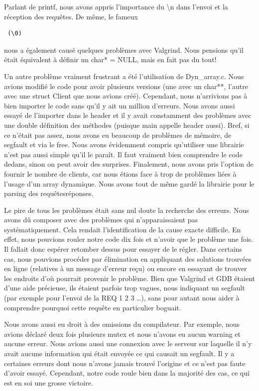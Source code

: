 \documentclass[11pt]{article}
\begin{document}
Parlant de printf, nous avons appris l’importance du \textbackslash n  dans l’envoi et la réception des requêtes. De même, le fameux \begin{verbatim} (\0) \end{verbatim} nous a également causé quelques problèmes avec Valgrind. Nous pensions qu’il était équivalent à définir un char* = NULL, mais en fait pas du tout! 

Un autre problème vraiment frustrant a été l’utilisation de Dyn\_array.c. Nous avions modifié le code pour avoir plusieurs versions (une avec un char**, l’autre avec une struct Client que nous avions créé). Cependant, nous n’arrivions pas à bien importer le code sans qu’il y ait un million d’erreurs. Nous avons aussi essayé de l’importer dans le header et il y avait constamment des problèmes avec une double définition des méthodes (puisque main appelle header aussi). Bref, si ce n’était pas assez, nous avons eu beaucoup de problèmes de mémoire, de segfault et via le free. Nous avons évidemment compris qu’utiliser une librairie n’est pas aussi simple qu’il le paraît. Il faut vraiment bien comprendre le code dedans, sinon on peut avoir des surprises. Finalement, nous avons pris l’option de fournir le nombre de clients, car nous étions face à trop de problèmes liées à l’usage d’un array dynamique. Nous avons tout de même gardé la librairie pour le parsing des requêtes\/réponses.

Le pire de tous les problèmes était sans nul doute la recherche des erreurs. Nous avons dû composer avec des problèmes qui n'apparaissaient pas systématiquement. Cela rendait l'identification de la cause exacte difficile. En effet, nous pouvions rouler notre code dix fois et n’avoir que le problème une fois. Il fallait donc espérer retomber dessus pour essayer de le régler. Dans certains cas, nous pouvions procéder par élimination en appliquant des solutions trouvées en ligne (relatives à un message d’erreur reçu) ou encore en essayant de trouver les endroits d’où pourrait provenir le problème. Bien que Valgrind et GDB étaient d'une aide précieuse, ils étaient parfois trop vagues, nous indiquant un segfault (par exemple pour l’envoi de la REQ 1 2 3 …), sans pour autant nous aider à comprendre pourquoi cette requête en particulier boguait. 

Nous avons aussi eu droit à des omissions du compilateur. Par exemple, nous avions déclaré deux fois plusieurs mutex et nous n'avons eu aucun warning et aucune erreur. Nous avions aussi une connexion avec le serveur sur laquelle il n'y avait aucune information qui était envoyée ce qui causait un segfault. Il y a certaines erreurs dont nous n'avons jamais trouvé l'origine et ce n'est pas faute d'avoir essayé. Cependant, notre code roule bien dans la majorité des cas, ce qui est en soi une grosse victoire. 
\end{document}
